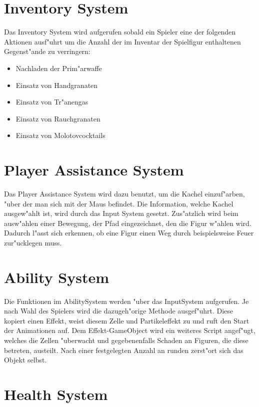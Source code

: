 \section{Inventory System}

Das Inventory System wird aufgerufen sobald ein Spieler eine der folgenden Aktionen ausf"uhrt um die Anzahl der im Inventar der Spielfigur enthaltenen Gegenst"ande zu verringern:\newline


\begin{itemize}
	\item Nachladen der Prim"arwaffe
	\item Einsatz von Handgranaten
	\item Einsatz von Tr"anengas
	\item Einsatz von Rauchgranaten
	\item Einsatz von Molotovcocktails
\end{itemize}





\section{Player Assistance System}
Das Player Assistance System wird dazu benutzt, um die Kachel einzuf"arben, "uber der man sich mit der Maus befindet. Die Information, welche Kachel ausgew"ahlt ist, wird durch das Input System gesetzt.
Zus"atzlich wird beim ausw"ahlen einer Bewegung, der Pfad eingezeichnet, den die Figur w"ahlen wird.
Dadurch l"asst sich erkennen, ob eine Figur einen Weg durch beispielsweise Feuer zur"ucklegen muss.


\section{Ability System}
Die Funktionen im AbilitySystem werden "uber das InputSystem aufgerufen. Je nach Wahl des Spielers wird die dazugeh"orige Methode ausgef"uhrt. Diese kopiert einen Effekt, weist diesem Zelle und Partikeleffekt zu und ruft den Start der Animationen auf. Dem Effekt-GameObject wird ein weiteres Script angef"ugt, welches die Zellen "uberwacht und gegebenenfalls Schaden an Figuren, die diese betreten, austeilt. Nach einer festgelegten Anzahl an runden zerst"ort sich das Objekt selbst.


\section{Health System}

